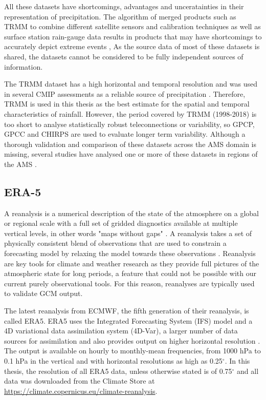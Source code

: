 All these datasets have shortcomings, advantages and unceratainties in their representation of precipitation. The algorithm of merged products such as TRMM to combine different satellite sensors and calibration techniques as well as surface station rain-gauge data results in products that may have shortcomings to accurately depict extreme events \citep{trejo2016}, 
As the source data of most of these datasets is shared, the datasets cannot be considered to be fully independent sources of information. 



The TRMM dataset has a high horizontal and temporal resolution and was used in several CMIP assessments \citep{geil2013,jones2013} as a reliable source of precipitation \citep{carvalho2012}. Therefore, TRMM is used in this thesis as the best estimate for the spatial and temporal characteristics of rainfall. However,
 the period covered by TRMM (1998-2018) is too short to analyse statistically robust teleconnections or variability, so GPCP, GPCC and CHIRPS are used to evaluate longer term variability.
 Although a thorough validation and comparison of these datasets across the AMS domain is missing, several studies have analysed  one or more of these datasets in regions of the AMS \citep[e.g.][]{franchito2009,dinku2010,trejo2016}.

\subsection{ERA-5}


A reanalysis is a numerical description of the state of the atmosphere on a global or regional scale with a full set of gridded diagnostics available at multiple vertical levels, in other words "maps without gaps" \citep{era5hersbach}. A reanalysis takes a set of physically consistent blend of observations that are used to constrain a forecasting model by relaxing the model towards these observations \citep[e.g.][]{fujiwara2021}.
Reanalysis are key tools for climate and weather research as they provide full pictures of the atmospheric state for long periods, a feature that could not be possible with our current purely observational tools. For this reason, reanalyses are typically used to validate GCM output. 

The latest reanalysis from ECMWF, the fifth generation of their reanalysis, is called ERA5. 
ERA5 uses the Integrated Forecasting System (IFS) model and a 4D variational data assimilation system (4D-Var), a larger number of data sources for assimilation and also provides output on higher horizontal resolution \citep{era5hersbach}. The output is available on hourly to monthly-mean frequencies, from 1000 hPa to 0.1 hPa in the vertical and with horizontal resolutions as high as 0.25$^\circ$. In this thesis, the resolution of all ERA5 data, unless otherwise stated is of 0.75$^\circ$ and all data was downloaded from the Climate Store at  \url{https://climate.copernicus.eu/climate-reanalysis}.


